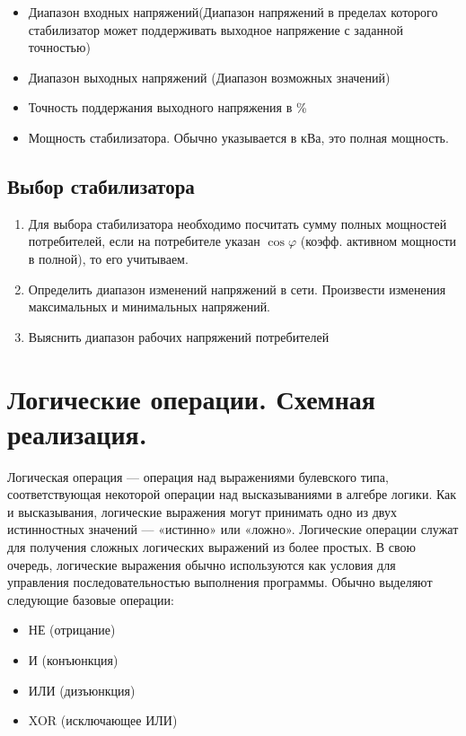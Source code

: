 \documentclass[unicode, 12pt, a4paper, oneside]{article}
\begin{document}
\begin{itemize}
\item Диапазон входных напряжений(Диапазон напряжений в пределах которого стабилизатор может поддерживать выходное напряжение с заданной точностью)
\item Диапазон  выходных напряжений (Диапазон возможных значений)
\item Точность поддержания выходного напряжения в \%
\item Мощность стабилизатора. Обычно указывается в кВа, это полная мощность.
\end{itemize}

\subsection*{Выбор стабилизатора}

\begin{enumerate}
\item Для выбора стабилизатора необходимо посчитать сумму полных мощностей потребителей, если на потребителе указан $\cos\varphi$ (коэфф. активном мощности в полной), то его учитываем.
\item Определить диапазон изменений напряжений в сети. Произвести изменения максимальных и минимальных напряжений.
\item Выяснить диапазон рабочих напряжений потребителей
\end{enumerate}


\section{Логические операции. Схемная реализация.}

Логическая операция — операция над выражениями булевского типа, соответствующая некоторой операции над высказываниями в алгебре логики. Как и высказывания, логические выражения могут принимать одно из двух истинностных значений — «истинно» или «ложно». Логические операции служат для получения сложных логических выражений из более простых. В свою очередь, логические выражения обычно используются как условия для управления последовательностью выполнения программы.
Обычно выделяют следующие базовые операции:

\begin{itemize}
\item НЕ (отрицание)
\item И (конъюнкция)
\item ИЛИ (дизъюнкция)
\item XOR (исключающее ИЛИ)
\end{itemize}
\end{document}
